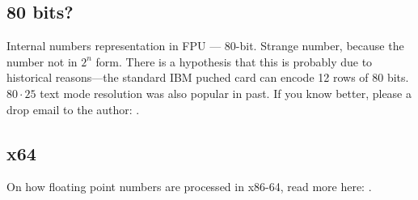 \subsection{80 bits?}

Internal numbers representation in FPU --- 80-bit.
Strange number, because the number not in $2^n$ form.
There is a hypothesis that this is probably due to historical reasons---the standard IBM puched card can encode 12 rows of 80 bits.
$80\cdot 25$ text mode resolution was also popular in past.
If you know better, please a drop email to the author: \EMAIL{}.

\subsection{x64}

On how floating point numbers are processed in x86-64, read more here: .


